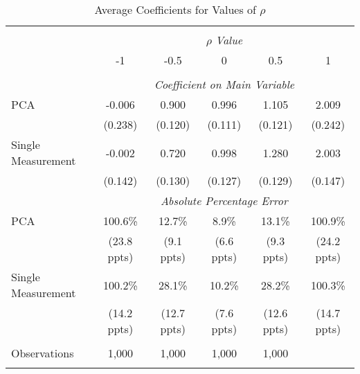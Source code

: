 \begin{table}[!htbp] \centering
  \caption{Average Coefficients for Values of $\rho$ \label{sim_rho_2}}
\begin{tabular}{@{\extracolsep{5pt}}lccccc}
\\[-1.8ex]\hline
\hline \\[-1.8ex]
& \multicolumn{5}{c}{$\rho$ \textit{ Value}} \
\cr 
\\[-1.8ex] & -1 & -0.5 & 0 & 0.5 & 1 \\
\hline \\[-1.8ex]
& \multicolumn{5}{c}{\textit{Coefficient on Main Variable}} \\
 PCA & -0.006 & 0.900 & 0.996 & 1.105 & 2.009  \\
  & (0.238) & (0.120) & (0.111) & (0.121) & (0.242)\\
  Single Measurement & -0.002 & 0.720 & 0.998 & 1.280 & 2.003  \\
  & (0.142) & (0.130) & (0.127) & (0.129) & (0.147)\\
& \multicolumn{5}{c}{\textit{Absolute Percentage Error}} \\
  PCA & 100.6\% & 12.7\% & 8.9\% & 13.1\% & 100.9\% \\
   & (23.8 ppts) & (9.1 ppts) & (6.6 ppts) & (9.3 ppts) & (24.2 ppts)\\
  Single Measurement & 100.2\% & 28.1\% & 10.2\% & 28.2\% & 100.3\%  \\
  & (14.2 ppts) & (12.7 ppts) & (7.6 ppts) & (12.6 ppts) & (14.7 ppts)\\
\hline \\[-1.8ex]
 Observations & 1,000 & 1,000 & 1,000 & 1,000 &\\
\hline
\hline \\[-1.8ex]
\end{tabular}
\end{table}
